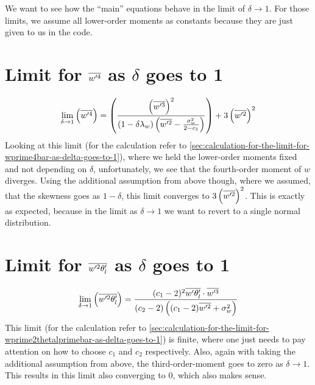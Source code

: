 We want to see how the \enquote{main} equations behave in the limit of $\delta \to 1$.
For those limits, we assume all lower-order moments as constants because they are just given to us in the code.


\section{Limit for \texorpdfstring{$\overline{w'^4}$}{wprime4bar} as \texorpdfstring{$\delta$}{delta} goes to 1}
\label{sec:limit-for-wprime4bar-as-delta-goes-to-1}

\begin{align}
    \label{eq:limit_wprime4_delta_to_1}
    \lim_{\delta \to 1}\left(\overline{w'^4}\right)
    = \left(
    \frac{
        \left(\overline{w'^3}\right)^2
    }{
        (1 - \delta\lambda_w)
        \left(\overline{w'^2} - \frac{\sigma_w^2}{2 - c_1}\right)
    }
    \right)
    + 3 \left(\overline{w'^2}\right)^2
\end{align}
Looking at this limit (for the calculation refer to \cref{sec:calculation-for-the-limit-for-wprime4bar-as-delta-goes-to-1}),
where we held the lower-order moments fixed and not depending on $\delta$,
unfortunately, we see that the fourth-order moment of $w$ diverges.
Using the additional assumption from above though,
where we assumed,
that the skewness goes as $1-\delta$,
this limit converges to $3 \left(\overline{w'^2}\right)^2$.
This is exactly as expected,
because in the limit as $\delta \to 1$ we want to revert to a single normal distribution.


\section{Limit for \texorpdfstring{$\overline{w'^2 \theta_l'}$}{wprime2thetalbar} as \texorpdfstring{$\delta$}{delta} goes to 1}
\label{sec:limit-for-wprime2thetalbar-as-delta-goes-to-1}

\begin{align}
    \label{eq:limit_wprime2thetalbar_delta_to_1}
    \lim_{\delta \to 1}\left(\overline{w'^2 \theta_l'}\right)
    = \frac{(c_1 - 2)^2 \overline{w' \theta_l'} \cdot \overline{w'^3}}{(c_2 - 2)\left((c_1 - 2)\overline{w'^2} + \sigma_w^2\right)}
\end{align}
This limit (for the calculation refer to \cref{sec:calculation-for-the-limit-for-wprime2thetalprimebar-as-delta-goes-to-1})
is finite, where one just needs to pay attention on how to choose $c_1$ and $c_2$ respectively.
Also, again with taking the additional assumption from above,
the third-order-moment goes to zero as $\delta \to 1$.
This results in this limit also converging to 0,
which also makes sense.



